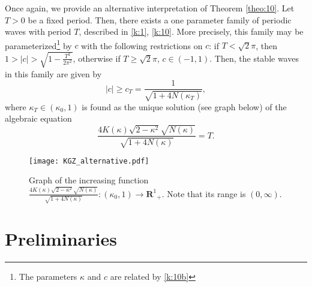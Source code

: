 \documentclass[final,11pt,leqno]{amsart}
\begin{document}
Once again, we provide an alternative interpretation of Theorem \ref{theo:10}. Let $T>0$ be a fixed period. Then, there exists a one parameter family of periodic waves with period $T$, described
 in \eqref{k:1}, \eqref{k:10}.  More precisely, this family may be  parameterized\footnote{The parameters ${\kappa}$ and $c$ are related by \eqref{k:10b}}  by $c$ with the following restrictions on $c$: if $T<\sqrt{2} \pi$, then
 $1>|c|>\sqrt{1-{\frac{{T^2}}{{2\pi^2}}}}$, otherwise if $T\geq \sqrt{2} \pi$, $c\in (-1,1)$. Then, the stable waves in this family are given by
 $$
 |c|\geq c_T= {\frac{{1}}{{\sqrt{1+4 N({\kappa}_T)}}}},
 $$
 where ${\kappa}_T\in ({\kappa}_0,1)$ is found as the unique solution (see graph below) of the algebraic equation
 $$
 {\frac{{4 K({\kappa}) \sqrt{2-{\kappa}^2} \sqrt{N({\kappa})}}}{{\sqrt{1+4 N({\kappa})}}}}=T.
 $$
 \begin{figure}[h6]
\centering
\texttt{[image: KGZ\_alternative.pdf]}
\caption{Graph of the increasing function
${\frac{{4 K({\kappa}) \sqrt{2-{\kappa}^2} \sqrt{N({\kappa})}}}{{\sqrt{1+4 N({\kappa})}}}}:({\kappa}_0, 1)\to {\mathbf R^1}_+$. Note that its range is $(0,\infty)$.}
\label{fig6}
\end{figure}

\section{Preliminaries}
\label{sec:2}
\end{document}
